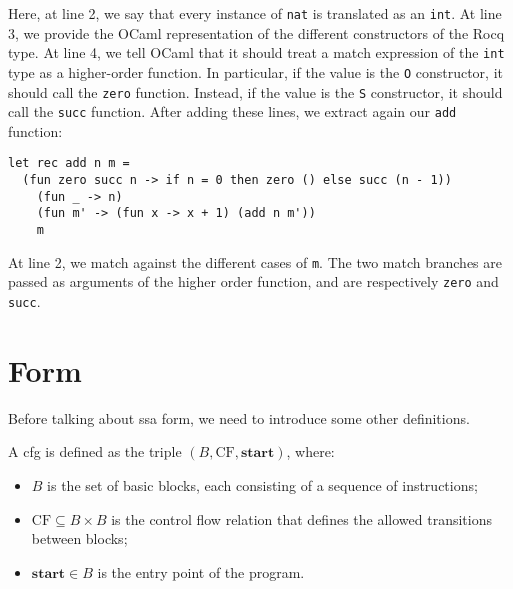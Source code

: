 Here, at line 2, we say that every instance of \texttt{nat} is translated as an \texttt{int}. At line 3, we provide the OCaml representation of the different constructors of the Rocq type. At line 4, we tell OCaml that it should treat a match expression of the \texttt{int} type as a higher-order function. In particular, if the value is the \texttt{O} constructor, it should call the \texttt{zero} function. Instead, if the value is the \texttt{S} constructor, it should call the \texttt{succ} function. After adding these lines, we extract again our \texttt{add} function:

\begin{lstlisting}[style=OCaml]
let rec add n m =
  (fun zero succ n -> if n = 0 then zero () else succ (n - 1))
    (fun _ -> n)
    (fun m' -> (fun x -> x + 1) (add n m'))
    m
\end{lstlisting}

At line 2, we match against the different cases of \texttt{m}. The two match branches are passed as arguments of the higher order function, and are respectively \texttt{zero} and \texttt{succ}.

\section{ Form}
\label{sec:ssa}


Before talking about \gls{ssa} form, we need to introduce some other definitions.

\begin{definition}\label{def:cfg}
  A \gls{cfg} is defined as the triple $(B, \text{CF}, \textbf{start})$, where:
  \begin{itemize}
    \item $B$ is the set of basic blocks, each consisting of a sequence of instructions;
    \item $\text{CF} \subseteq B \times B$ is the control flow relation that defines the allowed transitions between blocks;
    \item $\textbf{start} \in B$ is the entry point of the program.
  \end{itemize}
\end{definition}

